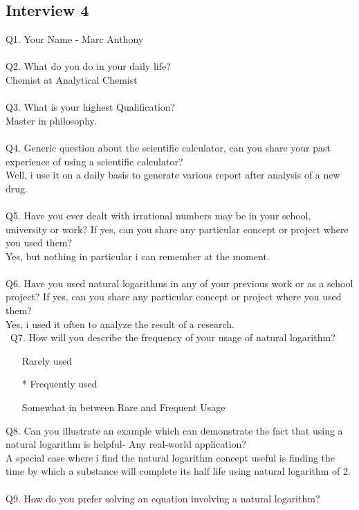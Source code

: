 \documentclass[12pt]{article}
\makeatletter
\newcommand*{\radiobutton}{%
  \@ifstar{\@radiobutton0}{\@radiobutton1}%
}
\newcommand*{\@radiobutton}[1]{%
  \begin{tikzpicture}
    \pgfmathsetlengthmacro\radius{height("X")/2}
    \draw[radius=\radius] circle;
    \ifcase#1 \fill[radius=.6*\radius] circle;\fi
  \end{tikzpicture}%
}
\makeatother
\begin{document}
\subsection{Interview 4}
Q1. Your Name -  Marc Anthony\\\\
Q2. What do you do in your daily life?\\
Chemist at Analytical Chemist\\\\
Q3. What is your highest Qualification?\\
Master in philosophy.\\\\
Q4. Generic question about the scientific calculator, can you share your past experience of using a scientific calculator?\\
Well, i use it on a daily basis to generate various report after analysis of a new drug.\\\\
Q5. Have you ever dealt with irrational numbers may be in your school, university or work? If yes, can you share any particular concept or project where you used them?\\
Yes, but nothing in particular i can remember at the moment.\\\\
Q6. Have you used natural logarithms in any of your previous work or as a school project? If yes, can you share any particular concept or project where you used them?\\
Yes, i used it often to analyze the result of a research.\\\
Q7. How will you describe the frequency of your usage of natural logarithm?
\begin{itemize}
\item[\radiobutton] Rarely used
\item[\radiobutton*] Frequently used
\item[\radiobutton] Somewhat in between Rare and Frequent Usage
\end{itemize}
Q8. Can you illustrate an example which can demonstrate the fact that using a natural logarithm is helpful- Any real-world application?\\
A special case where i find the natural logarithm concept useful is finding the time by which a substance will complete its half life using natural logarithm of 2.\\\\
Q9. How do you prefer solving an equation involving a natural logarithm?
\end{document}
